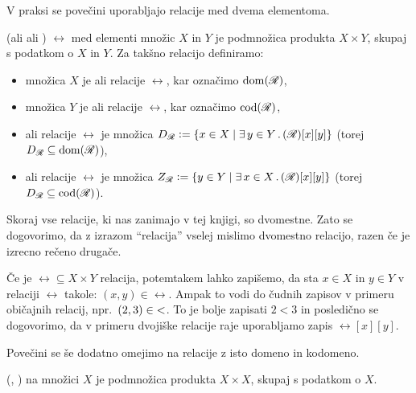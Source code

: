 
                V praksi se povečini uporabljajo relacije med dvema elementoma.
                \begin{definicija}
                         (ali  ali )  $\rel$ med elementi množic $X$ in $Y$ je podmnožica produkta $X \times Y$, skupaj s podatkom o $X$ in $Y$. Za takšno relacijo definiramo:
                        \begin{itemize}
                                \item
                                        množica $X$ je  ali  relacije $\rel$, kar označimo $\dom(\rel)$,
                                \item
                                        množica $Y$ je  ali  relacije $\rel$, kar označimo $\cod(\rel)$,
                                \item
                                         ali  relacije $\rel$ je množica $\dd{\rel} \dfeq \set{x \in X}{\some{y \in Y} \rel[x][y]}$ (torej $\dd{\rel} \subseteq \dom(\rel)$),
                                \item
                                         ali   relacije $\rel$ je množica $\rn{\rel} \dfeq \set{y \in Y}{\some{x \in X} \rel[x][y]}$ (torej $\dd{\rel} \subseteq \cod(\rel)$).
                        \end{itemize}
                \end{definicija}

                Skoraj vse relacije, ki nas zanimajo v tej knjigi, so dvomestne. Zato se dogovorimo, da z izrazom ``relacija'' vselej mislimo dvomestno relacijo, razen če je izrecno rečeno drugače.

                Če je $\rel \subseteq X \times Y$ relacija, potemtakem lahko zapišemo, da sta $x \in X$ in $y \in Y$ v relaciji $\rel$ takole: $(x, y) \in \rel$. Ampak to vodi do čudnih zapisov v primeru običajnih relacij, npr.~$(2, 3) \in \mathnormal{<}$. To je bolje zapisati $2 < 3$ in posledično se dogovorimo, da v primeru dvojiške relacije raje uporabljamo zapis $\rel[x][y]$.

                Povečini se še dodatno omejimo na relacije z isto domeno in kodomeno.
                \begin{definicija}
                         (, )  na množici $X$ je podmnožica produkta $X \times X$, skupaj s podatkom o $X$.
                \end{definicija}

